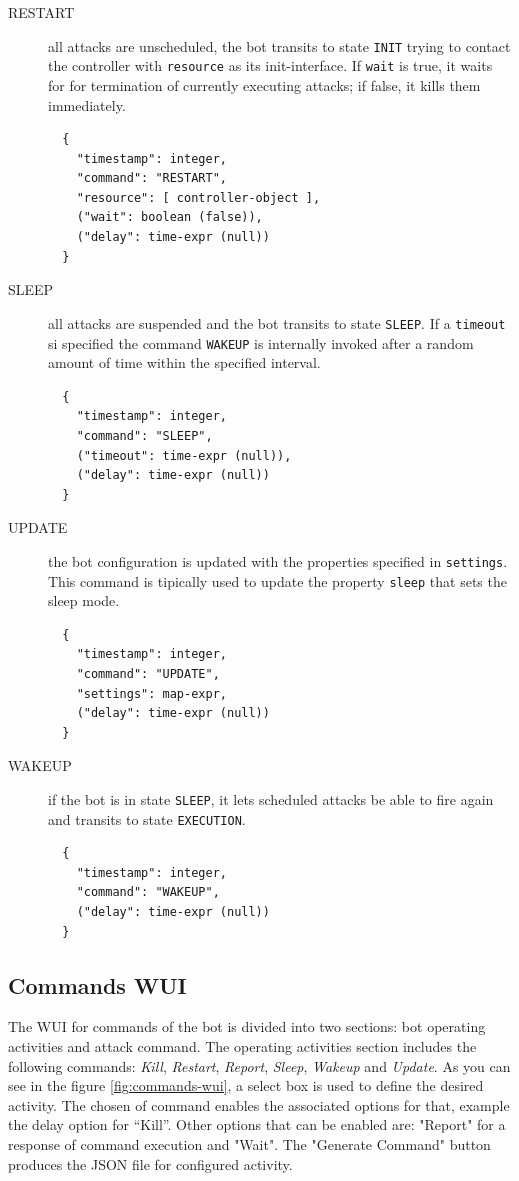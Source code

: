 \begin{description}
  \item[RESTART] all attacks are unscheduled, the bot transits to state \texttt{INIT} trying to contact the controller with \texttt{resource} as its init-interface.
  If \texttt{wait} is true, it waits for for termination of currently executing attacks; if false, it kills them immediately.

  \begin{verbatim}
  {
    "timestamp": integer,
    "command": "RESTART",
    "resource": [ controller-object ],
    ("wait": boolean (false)),
    ("delay": time-expr (null))
  }
  \end{verbatim}

  \item[SLEEP] all attacks are suspended and the bot transits to state \texttt{SLEEP}. If a \texttt{timeout} si specified the command \texttt{WAKEUP} is internally invoked after a random amount of time within the specified interval.

  \begin{verbatim}
  {
    "timestamp": integer,
    "command": "SLEEP",
    ("timeout": time-expr (null)),
    ("delay": time-expr (null))
  }
  \end{verbatim}

  \item[UPDATE] the bot configuration is updated with the properties specified in \texttt{settings}. This command is tipically used to update the property \texttt{sleep} that sets the sleep mode.

  \begin{verbatim}
  {
    "timestamp": integer,
    "command": "UPDATE",
    "settings": map-expr,
    ("delay": time-expr (null))
  }
  \end{verbatim}

  \item[WAKEUP] if the bot is in state \texttt{SLEEP}, it lets scheduled attacks be able to fire again and transits to state \texttt{EXECUTION}.

  \begin{verbatim}
  {
    "timestamp": integer,
    "command": "WAKEUP",
    ("delay": time-expr (null))
  }
  \end{verbatim}

\end{description}

\subsection{Commands WUI}\label{sec:commands-wui}
The WUI for commands of the bot is divided into two sections: bot operating activities and attack command. The operating activities section includes the following commands: \textit{Kill}, \textit{Restart}, \textit{Report}, \textit{Sleep}, \textit{Wakeup} and \textit{Update}. As you can see in the figure \ref{fig:commands-wui}, a select box is used to define the desired activity. The chosen of command enables the associated options for that, example the delay option for “Kill”. Other options that can be enabled are: "Report" for a response of command execution and "Wait". The "Generate Command" button produces the JSON file for configured activity.

